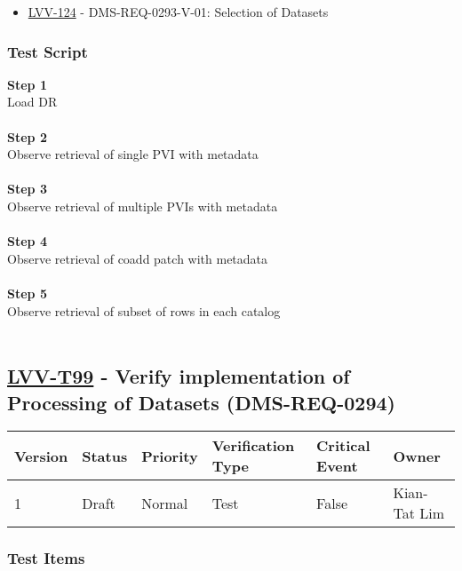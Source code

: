 \begin{itemize}
\tightlist
\item
  \href{https://jira.lsstcorp.org/browse/LVV-124}{LVV-124} -
  DMS-REQ-0293-V-01: Selection of Datasets
\end{itemize}

\hypertarget{test-script-75}{%
\subsubsection{Test Script}\label{test-script-75}}

\textbf{Step 1}\\
Load DR\\
~\\
\textbf{Step 2}\\
Observe retrieval of single PVI with metadata\\
~\\
\textbf{Step 3}\\
Observe retrieval of multiple PVIs with metadata\\
~\\
\textbf{Step 4}\\
Observe retrieval of coadd patch with metadata\\
~\\
\textbf{Step 5}\\
Observe retrieval of subset of rows in each catalog\\
~\\

\hypertarget{lvv-t99---verify-implementation-of-processing-of-datasets-dms-req-0294}{%
\subsection{\texorpdfstring{\href{https://jira.lsstcorp.org/secure/Tests.jspa\#/testCase/LVV-T99}{LVV-T99}
- Verify implementation of Processing of Datasets
(DMS-REQ-0294)}{LVV-T99 - Verify implementation of Processing of Datasets (DMS-REQ-0294)}}\label{lvv-t99---verify-implementation-of-processing-of-datasets-dms-req-0294}}

\begin{longtable}[]{@{}llllll@{}}
\toprule
Version & Status & Priority & Verification Type & Critical Event &
Owner\tabularnewline
\midrule
\endhead
1 & Draft & Normal & Test & False & Kian-Tat Lim\tabularnewline
\bottomrule
\end{longtable}

\hypertarget{test-items-75}{%
\subsubsection{Test Items}\label{test-items-75}}

